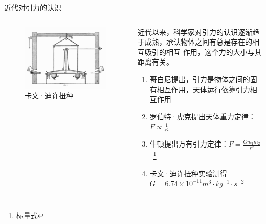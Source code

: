 \documentclass[10pt,aspectratio=43,mathserif]{beamer}
\begin{document}
\begin{frame}{近代对引力的认识}
    \begin{columns}
        \begin{column}{.4\linewidth}
            \centering
            \begin{figure}[htbp]
                \includegraphics[width=1\linewidth]{fig/Cavendish_Experiment.png}
                \caption{卡文·迪许扭秤}
                \label{fig:niucheng}
            \end{figure}
        \end{column}
    
    \hfill
    \begin{column}{.5\linewidth}
        近代以来，科学家对引力的认识逐渐趋于成熟，承认物体之间有总是存在的相互吸引的相互
        作用，这个力的大小与其距离有关。
        \begin{enumerate}
            \item 哥白尼提出，引力是物体之间的固有相互作用，天体运行依靠引力相互作用
            \item 罗伯特·虎克提出天体重力定律\cite{qadir1989relativity}：$F\propto \frac{1}{r^2}$
            \item 牛顿提出万有引力定律：$F=\frac{Gm_1m_2}{r^2}$\ \footnote{标量式}
            \item 卡文·迪许扭秤实验测得$G=6.74\times 10^{-11} m^3\cdot kg^{-1} \cdot s^{-2}$
        \end{enumerate}
    \end{column}
\end{columns}
\end{frame}
\end{document}
